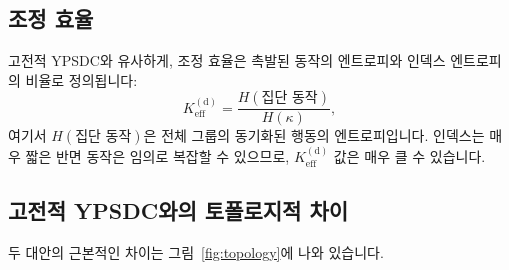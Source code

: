 \documentclass[11pt,a4paper]{article}
\newcommand{\Keff}{K_{\mathrm{eff}}}
\begin{document}
	\subsection{조정 효율}
	
	고전적 YPSDC와 유사하게, 조정 효율은 촉발된 동작의 엔트로피와 인덱스 엔트로피의 비율로 정의됩니다:
	\begin{equation}
		\Keff^{\mathrm{(d)}} = \frac{H(\text{집단 동작})}{H(\kappa)},
		\label{eq:Keff_d}
	\end{equation}
	여기서 \(H(\text{집단 동작})\)은 전체 그룹의 동기화된 행동의 엔트로피입니다. 인덱스는 매우 짧은 반면 동작은 임의로 복잡할 수 있으므로, \(\Keff^{\mathrm{(d)}}\) 값은 매우 클 수 있습니다.
	
	\subsection{고전적 YPSDC와의 토폴로지적 차이}
	
	두 대안의 근본적인 차이는 그림~\ref{fig:topology}에 나와 있습니다.
	
\end{document}
